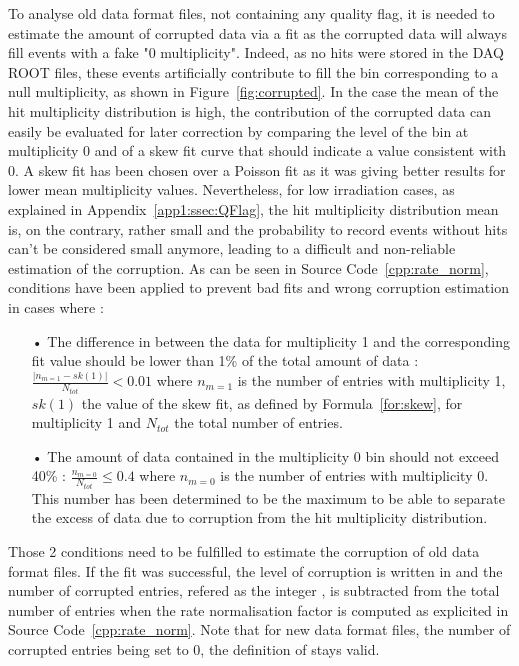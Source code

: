 	To analyse old data format files, not containing any quality flag, it is needed to estimate the amount of corrupted data via a fit as the corrupted data will always fill events with a fake "0 multiplicity". Indeed, as no hits were stored in the DAQ ROOT files, these events artificially contribute to fill the bin corresponding to a null multiplicity, as shown in Figure~\ref{fig:corrupted}. In the case the mean of the hit multiplicity distribution is high, the contribution of the corrupted data can easily be evaluated for later correction by comparing the level of the bin at multiplicity 0 and of a skew fit curve that should indicate a value consistent with 0. A skew fit has been chosen over a Poisson fit as it was giving better results for lower mean multiplicity  values. Nevertheless, for low irradiation cases, as explained in Appendix~\ref{app1:ssec:QFlag}, the hit multiplicity distribution mean is, on the contrary, rather small and the probability to record events without hits can't be considered small anymore, leading to a difficult and non-reliable estimation of the corruption. As can be seen in Source Code~\ref{cpp:rate_norm}, conditions have been applied to prevent bad fits and wrong corruption estimation in cases where :

	\begin{itemize}
		\item[•] The difference in between the data for multiplicity 1 and the corresponding fit value should be lower than 1\% of the total amount of data : $\frac{\vert n_{m=1} - sk(1)\vert}{N_{tot}} < 0.01$ where $n_{m=1}$ is the number of entries with multiplicity 1, $sk(1)$ the value of the skew fit, as defined by Formula~\ref{for:skew}, for multiplicity 1 and $N_{tot}$ the total number of entries.
		\item[•] The amount of data contained in the multiplicity 0 bin should not exceed 40\% : $\frac{n_{m=0}}{N_{tot}} \leq 0.4$ where $n_{m=0}$ is the number of entries with multiplicity 0. This number has been determined to be the maximum to be able to separate the excess of data due to corruption from the hit multiplicity distribution.
	\end{itemize}
	
	Those 2 conditions need to be fulfilled to estimate the corruption of old data format files. If the fit was successful, the  level of corruption is written in  and the number of corrupted entries, refered as the integer , is subtracted from the total number of entries when the rate normalisation factor is computed as explicited in Source Code~\ref{cpp:rate_norm}. Note that for new data format files, the number of corrupted entries being set to 0, the definition of  stays valid.\\
	
